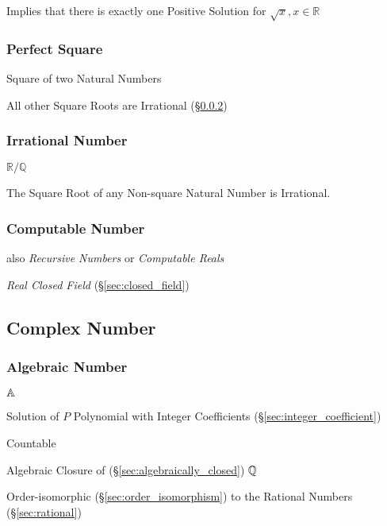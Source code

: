 Implies that there is exactly one Positive Solution for $\sqrt{x}, x
\in \mathbb{R}$



\subsubsection{Perfect Square}\label{sec:perfect_square}

Square of two Natural Numbers

All other Square Roots are Irrational (\S\ref{sec:irrational})



\subsubsection{Irrational Number}\label{sec:irrational}

$\mathbb{R}/\mathbb{Q}$

The Square Root of any Non-square Natural Number is Irrational.



\subsubsection{Computable Number}\label{sec:computable_real}

also \emph{Recursive Numbers} or \emph{Computable Reals}

\emph{Real Closed Field} (\S\ref{sec:closed_field})



\subsection{Complex Number}\label{sec:complex_number}

\subsubsection{Algebraic Number}\label{sec:algebraic_number}

$\mathbb{A}$

Solution of $P$ Polynomial with Integer Coefficients
(\S\ref{sec:integer_coefficient})

Countable

Algebraic Closure of (\S\ref{sec:algebraically_closed}) $\mathbb{Q}$

Order-isomorphic (\S\ref{sec:order_isomorphism}) to the Rational
Numbers (\S\ref{sec:rational})



